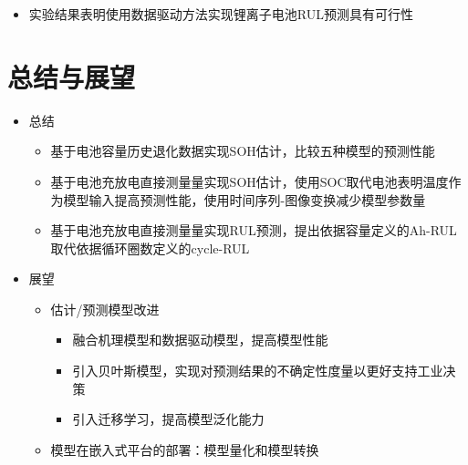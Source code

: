 \documentclass{beamer}
\begin{document}
\begin{frame}
\begin{table}[]
	\centering
	\caption{\fontsize{10.5bp}{17bp}DeepLSTM模型电池Ah-RUL预测性能}
	\end{table}
	\begin{itemize}
		\item 实验结果表明使用数据驱动方法实现锂离子电池RUL预测具有可行性
	\end{itemize}
\end{frame}

\section{总结与展望}

\begin{frame}
	\begin{itemize}
		\item 总结
			\begin{itemize}
				\item 基于电池容量历史退化数据实现SOH估计，比较五种模型的预测性能
				\item 基于电池充放电直接测量量实现SOH估计，使用SOC取代电池表明温度作为模型输入提高预测性能，使用时间序列-图像变换减少模型参数量
				\item 基于电池充放电直接测量量实现RUL预测，提出依据容量定义的Ah-RUL取代依据循环圈数定义的cycle-RUL
			\end{itemize}
		\item 展望
			\begin{itemize}
				\item 估计/预测模型改进
					\begin{itemize}
						\item 融合机理模型和数据驱动模型，提高模型性能
						\item 引入贝叶斯模型，实现对预测结果的不确定性度量以更好支持工业决策
						\item 引入迁移学习，提高模型泛化能力
					\end{itemize}
				\item 模型在嵌入式平台的部署：模型量化和模型转换
			\end{itemize}
	\end{itemize}
\end{frame}
\end{document}
